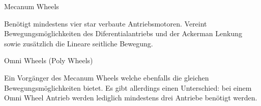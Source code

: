 \begin{flushleft}
Mecanum Wheels

Benötigt mindestens vier star verbaute Antriebsmotoren. Vereint Bewegungsmöglichkeiten des Diferentialantriebs
und der Ackerman Lenkung sowie zusätzlich die Lineare seitliche Bewegung.
\end{flushleft}

\begin{flushleft}
Omni Wheels (Poly Wheels)

Ein Vorgänger des Mecanum Wheels welche ebenfalls die gleichen Bewegungsmöglichkeiten bietet.
Es gibt allerdings einen Unterschied: bei einem Omni Wheel Antrieb werden lediglich mindestens drei Antriebe benötigt werden.
\end{flushleft}